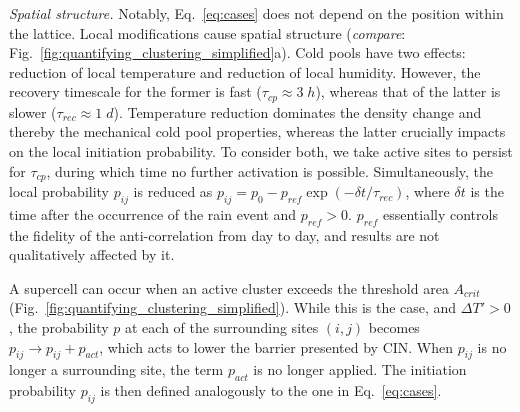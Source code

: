 \documentclass[draft,linenumbers]{agujournal2019}
\begin{document}
\noindent
{\it Spatial structure.} 
Notably, Eq.~\ref{eq:cases} does not depend on the position within the lattice. 
Local modifications cause spatial structure ({\it compare}: Fig.~\ref{fig:quantifying_clustering_simplified}a).
Cold pools have two effects: reduction of local temperature and reduction of local humidity. 
However, the recovery timescale for the former is fast ($\tau_{cp}\approx 3\;h$), whereas that of the latter is slower ($\tau_{rec}\approx 1\;d$).
Temperature reduction dominates the density change and thereby the mechanical cold pool properties, whereas the latter crucially impacts on the local initiation probability.
To consider both, we take active sites to persist for $\tau_{cp}$, during which time no further activation is possible.
Simultaneously, the local probability $p_{ij}$ is reduced as $p_{ij}=p_0-p_{ref}\exp(-\delta t/\tau_{rec})$, where $\delta t$ is the time after the occurrence of the rain event and $p_{ref}>0$. 
$p_{ref}$ essentially controls the fidelity of the anti-correlation from day to day, and results are not qualitatively affected by it.

A supercell can occur when an active cluster exceeds the threshold area $A_{crit}$ (Fig.~\ref{fig:quantifying_clustering_simplified}). 
While this is the case, and $\Delta T'>0$, the probability $p$ at each of the surrounding sites $(i,j)$ becomes $p_{ij}\rightarrow p_{ij}+p_{act}$, which acts to lower the barrier presented by CIN.
When $p_{ij}$ is no longer a surrounding site, the term $p_{act}$ is no longer applied.
The initiation probability $p_{ij}$ is then defined analogously to the one in Eq.~\ref{eq:cases}.
\end{document}
